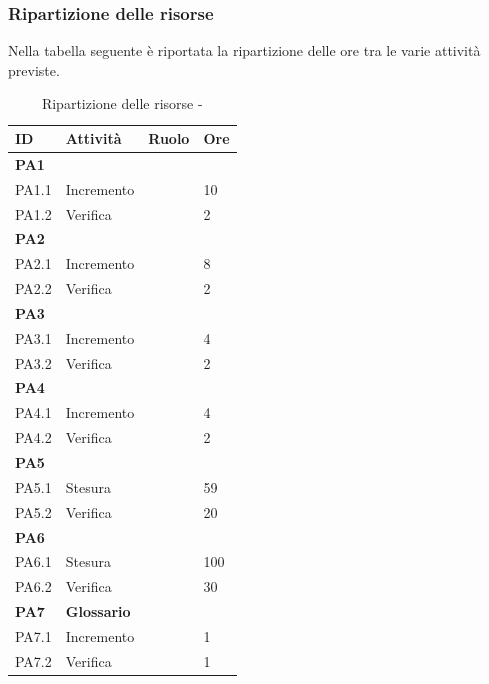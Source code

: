 \documentclass[12pt,a4paper]{article}
\begin{document}
\newpage
\subsubsection{Ripartizione delle risorse}
Nella tabella seguente è riportata la ripartizione delle ore tra le varie attività previste.

\begin{table}[H]
	\begin{center}
		\begin{tabular}{p{} p{} p{} p{}}
			\toprule
			\textbf{ID}	& \textbf{Attività}	& \textbf{Ruolo} & \textbf{Ore}\\ \midrule
			\midrule
			\textbf{PA1} & \textbf{\AdR{}} & &  \\ \midrule
			PA1.1 & Incremento & \AN{} & 10 \\ \midrule
			PA1.2 & Verifica & \VR{} & 2 \\ \midrule
			\textbf{PA2} & \textbf{\NdP{}} &  &  \\ \midrule
			PA2.1 & Incremento & \AM{} & 8 \\ \midrule
			PA2.2 & Verifica & \VR{} & 2 \\ \midrule
			\textbf{PA3} & \textbf{\PdP{}} & &  \\ \midrule
			PA3.1 & Incremento & \RE{} & 4 \\ \midrule
			PA3.2 & Verifica & \VR{} & 2 \\ \midrule
			\textbf{PA4} & \textbf{\PdQ{}} & &  \\ \midrule
			PA4.1 & Incremento & \RE{} & 4 \\ \midrule
			PA4.2 & Verifica & \VR{} & 2 \\ \midrule
			\textbf{PA5} & \textbf{\ST{}} & &  \\ \midrule
			PA5.1 & Stesura & \PG{} & 59 \\ \midrule
			PA5.2 & Verifica & \VR{} & 20 \\ \midrule
			\textbf{PA6} & \textbf{\DP{}} & &  \\ \midrule
			PA6.1 & Stesura & \PG{} & 100 \\ \midrule
			PA6.2 & Verifica & \VR{} & 30 \\ \midrule
			\textbf{PA7} & \textbf{Glossario} & &  \\ \midrule
			PA7.1 & Incremento & \VR{} & 1 \\ \midrule
			PA7.2 & Verifica & \VR{} & 1 \\
			\bottomrule
		\end{tabular}
		\caption{Ripartizione delle risorse - \FPA{}}
	\end{center}
\end{table}
\end{document}
